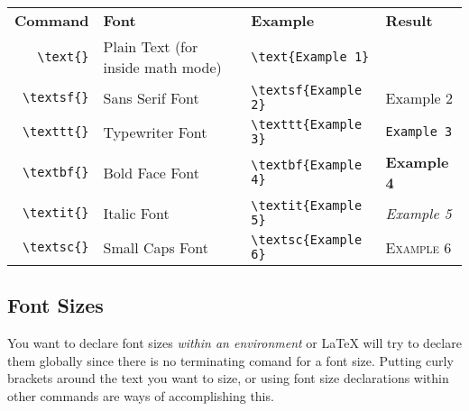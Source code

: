 \documentclass[letterpaper,twoside,10pt]{article}
\begin{document}
\begin{center}
 \begin{tabular}{rlll}
	\small\textbf{Command} & \small\textbf{Font} & \small\textbf{Example} & \small\textbf{Result}\\
  	\small\verb!\text{}! & \small Plain Text (for inside math mode) & \small\verb!\text{Example 1}! & \small\text{Example 1}\\
	\small\verb!\textsf{}! & \small Sans Serif Font & \small\verb!\textsf{Example 2}! & \small\textsf{Example 2}\\
	\small\verb!\texttt{}! & \small Typewriter Font & \small\verb!\texttt{Example 3}! & \small\texttt{Example 3}\\
	\small\verb!\textbf{}! & \small Bold Face Font & \small\verb!\textbf{Example 4}! & \small\textbf{Example 4}\\
	\small\verb!\textit{}! & \small Italic Font & \small\verb!\textit{Example 5}! & \small\textit{Example 5}\\
	\small\verb!\textsc{}! & \small Small Caps Font & \small\verb!\textsc{Example 6}! & \small\textsc{Example 6}\\
 \end{tabular}
\end{center}


\newpage
\subsection{Font Sizes}

You want to declare font sizes \textit{within an environment} or {\LaTeX} will try to declare them globally since there is no terminating comand for a font size. Putting curly brackets around the text you want to size, or using font size declarations within other commands are ways of accomplishing this. 
\end{document}
